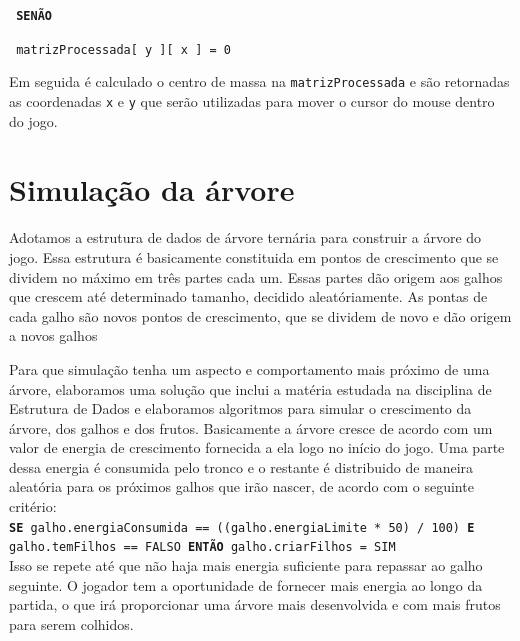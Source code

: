 \documentclass[12pt]{article}
\begin{document}
\hspace{0.1cm} \texttt{\footnotesize{ \textbf{SEN\~AO}}}

\hspace{0.3cm} \texttt{\footnotesize{ matrizProcessada[ y ][ x ] = 0}}


Em seguida \'e calculado o centro de massa na \texttt{matrizProcessada} e s\~ao retornadas as coordenadas \texttt{x} e \texttt{y}
que ser\~ao utilizadas para mover o cursor do mouse dentro do jogo.

\section{Simula\c c\~ao da \'arvore}

Adotamos a estrutura de dados de \'arvore tern\'aria para construir a \'arvore do jogo. Essa estrutura \'e basicamente constituida
em pontos de crescimento que se dividem no m\'aximo em tr\^es partes cada um. Essas partes d\~ao origem aos galhos que crescem at\'e
determinado tamanho, decidido aleat\'oriamente. As pontas de cada galho s\~ao novos pontos de crescimento,
que se dividem de novo e d\~ao origem a novos galhos

Para que simula\c c\~ao tenha um aspecto e comportamento mais pr\'oximo de uma \'arvore, elaboramos uma solu\c c\~ao que inclui
a mat\'eria estudada na disciplina de Estrutura de Dados e elaboramos algoritmos para simular o crescimento da \'arvore,
dos galhos e dos frutos. Basicamente a \'arvore cresce de acordo com um valor de energia de crescimento fornecida
a ela logo no in\'icio do jogo. Uma parte dessa energia \'e consumida pelo tronco e o restante \'e distribuido
de maneira aleat\'oria para os pr\'oximos galhos que ir\~ao nascer, de acordo com o seguinte crit\'erio: \\

 \texttt{\footnotesize{\textbf{SE} galho.energiaConsumida == ((galho.energiaLimite * 50) / 100) \textbf{E} galho.temFilhos == FALSO 
        \textbf{ENT\~AO} galho.criarFilhos = SIM}} \\


Isso se repete at\'e que n\~ao haja mais energia suficiente
para repassar ao galho seguinte. O jogador tem a oportunidade de fornecer mais energia ao longo da partida, o que
ir\'a proporcionar uma \'arvore mais desenvolvida e com mais frutos para serem colhidos.
\end{document}
